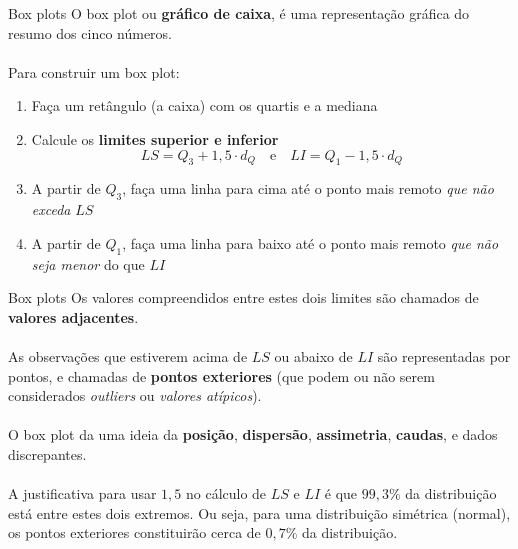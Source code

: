 \documentclass[10pt]{beamer}\usepackage[]{graphicx}\usepackage[]{color}
\theoremstyle{definition}
\begin{document}
\begin{frame}{Box plots}
  O box plot ou \textbf{gráfico de caixa}, é uma representação gráfica
  do resumo dos cinco números. \\~\\
  Para construir um box plot:
  \begin{enumerate}
  \item Faça um retângulo (a caixa) com os quartis e a mediana
  \item Calcule os \textbf{limites superior e inferior}
    \begin{equation*}
      LS = Q_3 + 1,5 \cdot d_Q \quad \text{e} \quad LI = Q_1 - 1,5 \cdot d_Q
    \end{equation*}
    \item A partir de $Q_3$, faça uma linha para cima até o ponto mais
      remoto \textit{que não exceda} $LS$
    \item A partir de $Q_1$, faça uma linha para baixo até o ponto mais
      remoto \textit{que não seja menor} do que $LI$
  \end{enumerate}
\end{frame}

\begin{frame}{Box plots}
  Os valores compreendidos entre estes dois limites são chamados de
  \textbf{valores adjacentes}. \\~\\
  As observações que estiverem acima de $LS$ ou abaixo de $LI$ são
  representadas por pontos, e chamadas de \textbf{pontos exteriores}
  (que podem ou não serem considerados \textit{outliers} ou
  \textit{valores atípicos}). \\~\\
  O box plot da uma ideia da \textbf{posição}, \textbf{dispersão},
  \textbf{assimetria}, \textbf{caudas}, e dados discrepantes. \\~\\
  A justificativa para usar $1,5$ no cálculo de $LS$ e $LI$ é que $99,3\%$
  da distribuição está entre estes dois extremos. Ou seja, para uma
  distribuição simétrica (normal), os pontos exteriores constituirão
  cerca de $0,7\%$ da distribuição.
\end{frame}
\end{document}
